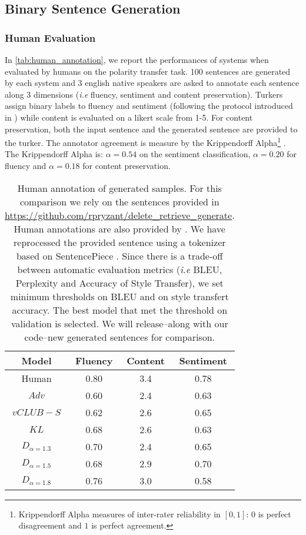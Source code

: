 \subsection{Binary Sentence Generation}



\subsubsection{Human Evaluation} 
In \autoref{tab:human_annotation}, we report the performances of systems when evaluated by humans on the polarity transfer task. 100 sentences are generated by each system and 3 english native speakers are asked to annotate each sentence along 3 dimensions (\textit{i.e} fluency, sentiment and content preservation). Turkers assign binary labels to fluency and sentiment (following the protocol introduced in \citet{jalalzai2020heavy}) while content is evaluated on a likert scale from 1-5. For content preservation, both the input sentence and the generated sentence are provided to the turker. The annotator agreement is measure by the Krippendorff Alpha\footnote{Krippendorff Alpha measures of inter-rater reliability in $[0,1]$: $0$ is perfect disagreement and $1$ is perfect agreement.} \cite{krippendorff2018content}. The Krippendorff Alpha is: $\alpha=0.54$ on the sentiment classification, $\alpha=0.20$ for fluency and $\alpha=0.18$ for content preservation.

\begin{table}[t]
\centering
   \begin{tabular}[h]{c|ccc}
   \hline 
   Model &  Fluency & Content & Sentiment\\\hline
Human& 0.80 & 3.4 & 0.78 \\\hline
$Adv$ & 0.60& 2.4 & 0.63 \\
$vCLUB-S$ & 0.62& 2.6 & 0.65 \\
$KL$  & 0.68 & 2.6 &  0.63 \\
$D_{\alpha = 1.3}$ & 0.70 & 2.4 &  0.65  \\
$D_{\alpha = 1.5}$ &0.68 & 2.9 &  0.70  \\
$D_{\alpha = 1.8}$ &0.76& 3.0 &  0.58 \\\hline
\end{tabular}
\caption{Human annotation of generated samples. For this comparison we rely on the sentences provided in \url{https://github.com/rpryzant/delete_retrieve_generate}. Human annotations are also provided by \citet{li2018delete}. We have reprocessed the provided sentence using a tokenizer based on SentencePiece \cite{tok_0,tok_1}. Since there is a trade-off between automatic evaluation metrics (\textit{i.e} BLEU, Perplexity and Accuracy of Style Transfer), we set
minimum thresholds on BLEU and on style transfert accuracy. The best model that met the threshold on validation is selected. We will release--along with our code--new generated sentences for comparison.}
\label{tab:human_annotation}
\end{table}
